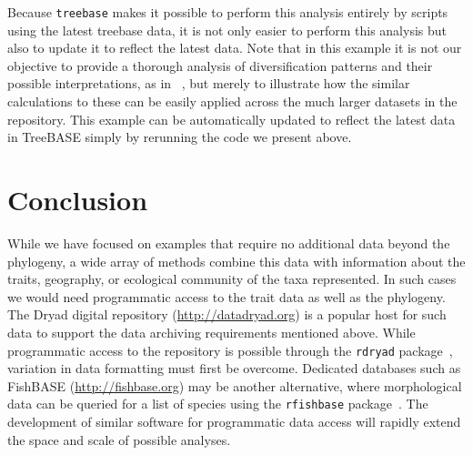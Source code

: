 \documentclass[authoryear, preprint]{elsarticle}
\begin{document}
%
%
%
Because \texttt{treebase} makes it possible to perform this analysis entirely by scripts using the latest treebase data, 
it is not only easier to perform this analysis but also to update it to reflect the latest data.
Note that in this example it is not our objective to provide a thorough analysis of diversification patterns and their possible interpretations, as in ~\citet{Pybus2000, McPeek2007, McPeek2008, Phillimore2008}, 
but merely to illustrate how the similar calculations to these can be easily applied across the much larger datasets in the repository.  
This example can be automatically updated to reflect the latest data in TreeBASE simply by rerunning the code we present above.  



\section{Conclusion}

While we have focused on examples that require no additional data beyond the phylogeny, a wide array of methods combine this data with information about the traits, geography, or ecological community of the taxa represented.  In such cases we would need programmatic access to the trait data as well as the phylogeny.  The Dryad digital repository (\href{http://datadryad.org}{http://datadryad.org}) is a popular host for such data to support the data archiving requirements mentioned above.  While programmatic access to the repository is possible through the \texttt{rdryad} package~\citep{Chamberlain2012}, variation in data formatting must first be overcome.  Dedicated databases such as FishBASE (\href{http://fishbase.org}{http://fishbase.org}) may be another alternative, where morphological data can be queried for a list of species using the \texttt{rfishbase} package~\citep{Boettiger2011}.  The development of similar software for programmatic data access will rapidly extend the space and scale of possible analyses.  
\end{document}
